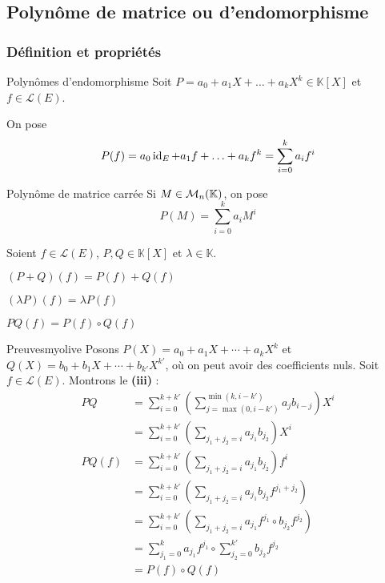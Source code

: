 \subsection{Polynôme de matrice ou d’endomorphisme} 

    \subsubsection{Définition et propriétés}

    \begin{defi}{Polynômes d’endomorphisme}{}
        Soit $P = a_0 + a_1 X + \ldots + a_k X^k \in \mathbb{K}[X]$ et $f \in \mathcal{L}(E)$.

        On pose 
        \[ P(f) = a_0 \operatorname{id}_E + a_1 f + \ldots + a_k f^k = \sum_{i=0}^k a_i f^i \]
    \end{defi}

    \begin{defi}{Polynôme de matrice carrée}{}
        Si $M \in \mathcal{M}_{n}(\mathbb{K})$, on pose 
        \[ P(M) = \sum_{i=0}^{k} a_i M^i \]
    \end{defi}

    \begin{prop}{}{}
        Soient $f \in \mathcal{L}(E)$, $P,Q \in \mathbb{K}[X]$ et $\lambda \in \mathbb{K}$.
        \begin{alors}
            \item $(P+Q)(f) = P(f) + Q(f)$
            \item $(\lambda P)(f) = \lambda P(f)$
            \item $PQ(f) = P(f) \circ Q(f)$
        \end{alors}
    \end{prop}

    \begin{demo}{Preuves}{myolive}
        Posons $P(X) = a_0 + a_1 X + \cdots + a_k X^k$ et $Q(X) = b_0 + b_1 X + \cdots + b_{k'} X^{k'}$, où on peut avoir des coefficients nuls. Soit $f \in \mathcal{L}(E)$. Montrons le \textbf{(iii)} :
        \begin{align*}
            PQ 
            &= \sum_{i=0}^{k + k'} \left( \sum_{j = \max(0, i-k')}^{\min(k, i-k')} a_j b_{i - j} \right)X^i \\
            &= \sum_{i=0}^{k + k'} \left( \sum_{j_1 + j_2 = i} a_{j_1} b_{j_2} \right)X^i \\
            PQ(f) 
            &= \sum_{i=0}^{k + k'} \left(\sum_{j_1 + j_2 = i} a_{j_1} b_{j_2}\right) f^i \\
            &= \sum_{i=0}^{k + k'} \left(\sum_{j_1 + j_2 = i} a_{j_1} b_{j_2} f^{j_1 + j_2}\right) \\
            &= \sum_{i=0}^{k + k'} \left(\sum_{j_1 + j_2 = i} a_{j_1} f^{j_1} \circ b_{j_2} f^{j_2}\right) \\
            &= \sum_{j_1 = 0}^{k} a_{j_1} f^{j_1} \circ \sum_{j_2 = 0}^{k'} b_{j_2} f^{j_2} \\
            &= P(f) \circ Q(f) \\
        \end{align*}
    \end{demo}

